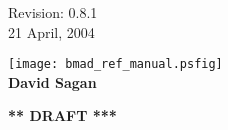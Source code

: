 \thispagestyle{empty}

\begin{flushright}
\large
  Revision: 0.8.1 \\
  21 April, 2004 \\
\end{flushright}

\vfill

{
\begin{center}
\texttt{[image: bmad\_ref\_manual.psfig]} \\
\vskip 0.3in
\huge\bf David Sagan
\end{center}
}

\vskip 1in
\begin{center}
{\Huge \bf *** DRAFT ***}
\end{center}
\vfill
\break